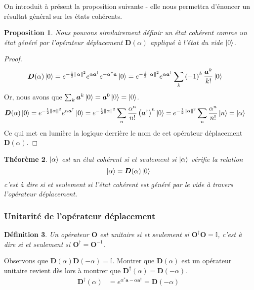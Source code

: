 \documentclass[11pt,oneside,a4paper]{article}
\newtheorem{theorem}{Théorème}[section]
\newtheorem{definition}[theorem]{Définition}
\newtheorem{property}[theorem]{Proposition}
\begin{document}
On introduit à présent la proposition suivante - elle nous permettra d'énoncer un résultat général sur les états cohérents.

\begin{property}
  Nous pouvons similairement définir un état cohérent comme un état généré par l'opérateur déplacement $\bm{D}(\alpha)$ appliqué à l'état du vide $\ket{0}$.
\end{property}
\begin{proof}
  \begin{align*}
    \bm{D}(\alpha)\ket{0} &=  e^{-\frac{1}{2}\norm{\alpha}^2}e^{\alpha\bm{a}^\dagger}e^{-\alpha^*\bm{a}}\ket{0} = e^{-\frac{1}{2}\norm{\alpha}^2}e^{\alpha\bm{a}^\dagger} \sum_k \left(-1\right)^k \frac{\bm{a}^k}{k!}\ket{0}
  \end{align*}
  Or, nous avons que $\sum_k \bm{a}^k\ket{0} = \bm{a}^0\ket{0} = \ket{0}$.
  \begin{align*}
    \bm{D}(\alpha)\ket{0} &= e^{-\frac{1}{2}\norm{\alpha}^2}e^{\alpha\bm{a}^\dagger}\ket{0} =  e^{-\frac{1}{2}\norm{\alpha}^2} \sum_n \frac{\alpha^n}{n!}\left(\bm{a}^\dagger\right)^n\ket{0} = e^{-\frac{1}{2}\norm{\alpha}^2} \sum_n \frac{\alpha^n}{n!}\ket{n} = \ket{\alpha}
  \end{align*}
  Ce qui met en lumière la logique derrière le nom de cet opérateur déplacement $\bm{D}(\alpha)$.
\end{proof}

\begin{theorem}
  $\ket{\alpha}$ est un état cohérent si et seulement si $\ket{\alpha}$ vérifie la relation
  \begin{equation*}
    \ket{\alpha}=\bm{D}(\alpha)\ket{0}
  \end{equation*}
  c'est à dire si et seulement si l'état cohérent est généré par le vide à travers l'opérateur déplacement.
\end{theorem}

\subsubsection{Unitarité de l'opérateur déplacement}

\begin{definition}
  Un opérateur $\bm{O}$ est unitaire si et seulement si $\bm{O}^\dagger\bm{O} = \mathbb{I}$, c'est à dire si et seulement si $\bm{O}^\dagger = \bm{O}^{-1}$.
\end{definition}

Observons que $\bm{D}(\alpha)\bm{D}(-\alpha) = \mathbb{I}$. Montrer que $\bm{D}(\alpha)$ est un opérateur unitaire revient dès lors à montrer que $\bm{D}^\dagger(\alpha) = \bm{D}(-\alpha)$.
\begin{align*}
  \bm{D}^\dagger(\alpha) &= e^{\alpha^*\bm{a}-\alpha\bm{a}^\dagger} = \bm{D}(-\alpha) 
\end{align*}
\end{document}
